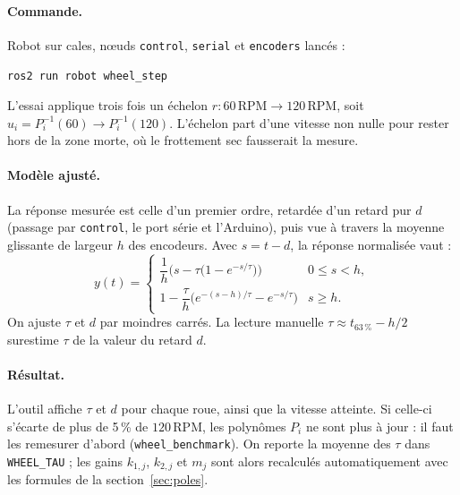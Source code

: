 \documentclass[11pt,a4paper]{article}
\newcommand{\SI}[2]{\ensuremath{#1\,\mathrm{#2}}}
\begin{document}
\paragraph{Commande.} Robot sur cales, nœuds \texttt{control}, \texttt{serial} et \texttt{encoders} lancés :
\begin{center}\texttt{ros2 run robot wheel\_step}\end{center}
L'essai applique trois fois un échelon $r:\SI{60}{RPM}\rightarrow\SI{120}{RPM}$, soit $u_i=P_i^{-1}(60)\rightarrow P_i^{-1}(120)$.
L'échelon part d'une vitesse non nulle pour rester hors de la zone morte, où le frottement sec fausserait la mesure.

\paragraph{Modèle ajusté.}
La réponse mesurée est celle d'un premier ordre, retardée d'un retard pur $d$ (passage par \texttt{control}, le port série et l'Arduino),
puis vue à travers la moyenne glissante de largeur $h$ des encodeurs.
Avec $s=t-d$, la réponse normalisée vaut :
\begin{equation}
y(t)=
\begin{cases}
\dfrac{1}{h}\Big(s-\tau\big(1-e^{-s/\tau}\big)\Big) & 0\le s<h,\\[3mm]
1-\dfrac{\tau}{h}\Big(e^{-(s-h)/\tau}-e^{-s/\tau}\Big) & s\ge h .
\end{cases}
\end{equation}
On ajuste $\tau$ et $d$ par moindres carrés. La lecture manuelle $\tau\approx t_{63\,\%}-h/2$ surestime $\tau$ de la valeur du retard $d$.

\paragraph{Résultat.}
L'outil affiche $\tau$ et $d$ pour chaque roue, ainsi que la vitesse atteinte.
Si celle-ci s'écarte de plus de 5\,\% de \SI{120}{RPM}, les polynômes $P_i$ ne sont plus à jour : il faut les remesurer d'abord (\texttt{wheel\_benchmark}).
On reporte la moyenne des $\tau$ dans \texttt{WHEEL\_TAU} ; les gains $k_{1,j}$, $k_{2,j}$ et $m_j$ sont alors recalculés automatiquement
avec les formules de la section~\ref{sec:poles}.
\end{document}
